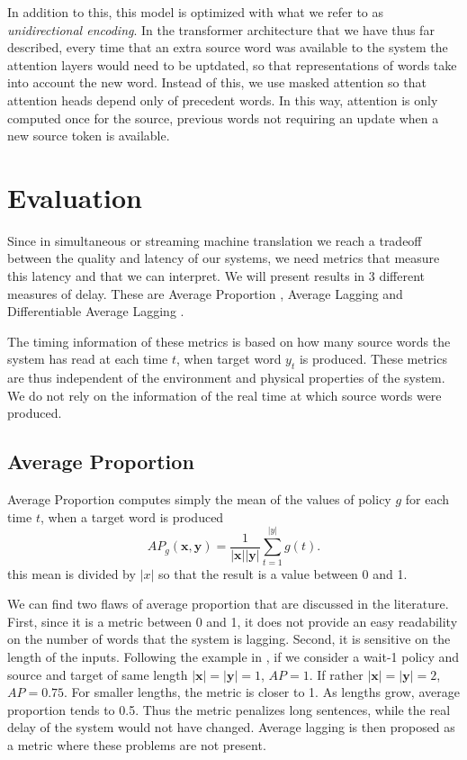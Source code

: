 \documentclass[11pt,english,listoffigures,listoftables]{tfgetsinf}
\newcommand{\vect}[1]{\mathbf{#1}}
\begin{document}
In addition to this, this model is optimized with what we refer to as \textit{unidirectional encoding}. In the transformer architecture that we have thus far described, every time that an extra source word was available to the system the attention layers would need to be uptdated, so that representations of words take into account the new word. Instead of this, we use masked attention so that attention heads depend only of precedent words. In this way, attention is only computed once for the source, previous words not requiring an update when a new source token is available.


\section{Evaluation}
Since in simultaneous or streaming machine translation we reach a tradeoff between the quality and latency of our systems, we need metrics that measure this latency and that we can interpret. 
We will present results in 3 different measures of delay. These are Average Proportion \cite{ma-etal-2019-stacl}, Average Lagging \cite{DBLP:journals/corr/ChoE16}
and Differentiable Average Lagging \cite{DBLP:journals/corr/abs-1906-00048}. 

The timing information of these metrics is based on how many source words the system has read at each time $t$, when target word $y_t$ is produced. These metrics are thus independent of the environment and physical properties of the system. We do not rely on the information of the real time at which source words were produced.  

\subsection{Average Proportion}
Average Proportion computes simply the mean of the values of policy $g$ for each time $t$, when a target word is produced
\begin{equation}
    AP_g(\vect{x}, \vect{y}) = \frac{1}{|\vect{x}||\vect{y}|} \sum_{t=1}^{|y|}g(t).
\end{equation}
this mean is divided by $|x|$ so that the result is a value between 0 and 1.

We can find two flaws of average proportion that are discussed in the literature. First, since it is a metric between 0 and 1, it does not provide an easy readability on the number of words that the system is lagging. Second, it is sensitive on the length of the inputs. Following the example in \cite{DBLP:journals/corr/ChoE16}, if we consider a wait-1 policy and source and target of same length $|\vect{x}| = |\vect{y}| = 1$, $AP = 1$. If rather $|\vect{x}| = |\vect{y}| = 2$, $AP = 0.75$.
For smaller lengths, the metric is closer to 1. As lengths grow, average proportion tends to 0.5. Thus the metric penalizes long sentences, while the real delay of the system would not have changed. Average lagging is then proposed as a metric where these problems are not present.
\end{document}
